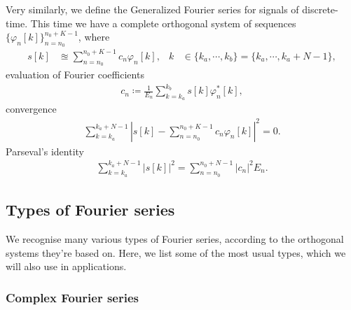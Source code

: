 \documentclass[11pt,a4paper]{report}
\theoremstyle{remark}
\theoremstyle{definition}
\begin{document}
				Very similarly, we define the Generalized Fourier series for signals of discrete-time. This time we have a complete orthogonal system of sequences $\{ \varphi_n[k] \}_{n=n_0}^{n_0+K-1}$, where
				\begin{align}
					\label{def:dtgfs}
					s[k] &\approxeq \sum_{n=n_0}^{n_0+K-1} c_n \varphi_n[k],
				&
					k &\in \{ k_a, \cdots, k_b \} = \{ k_a, \cdots, k_a+N-1 \},
				\end{align}
				evaluation of Fourier coefficients
				\begin{align}
					\label{def:dtgfscoeffs}
				c_n \coloneqq \frac{1}{E_n} \sum_{k=k_a}^{k_b} s[k] \varphi_n^*[k],
				\end{align}
				convergence
				\begin{align}
					\label{eq:dtnormconv}
					\sum_{k=k_a}^{k_a+N-1} \left| s[k] - \sum_{n=n_0}^{n_0+K-1} c_n \varphi_n[k] \right|^2 = 0.
				\end{align}
				Parseval's identity
				\begin{align}
					\label{dtpars}
					\sum_{k=k_a}^{k_a+N-1} |s[k]|^2 = \sum_{n=n_0}^{n_0+N-1} |c_n|^2 E_n.
				\end{align}
				
			\subsection{Types of Fourier series}
				
				We recognise many various types of Fourier series, according to the orthogonal systems they're based on. Here, we list some of the most usual types, which we will also use in applications.
				
				\subsubsection{Complex Fourier series}
					
\end{document}
